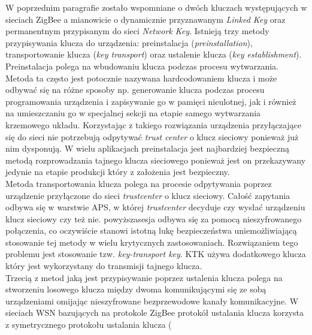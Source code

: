 \par W poprzednim paragrafie zostało wspomniane o dwóch kluczach występujących w sieciach ZigBee a mianowicie o dynamicznie przyznawanym \textit{Linked Key} oraz permanentnym przypisanym do sieci \textit{Network Key}. Istnieją trzy metody przypisywania klucza do urządzenia: preinstalacja (\textit{preinstallation}), transportowanie klucza (\textit{key transport}) oraz ustalenie klucza (\textit{key establishment}). \\
Preinstalacja polega na wbudowaniu klucza podczas procesu wytwarzania. Metoda ta często jest potocznie nazywana hardcodowaniem klucza i może odbywać się na różne sposoby np. generowanie klucza podczas procesu programowania urządzenia i zapisywanie go w pamięci nieulotnej, jak i również na umieszczaniu go w specjalnej sekcji na etapie samego wytwarzania krzemowego układu. Korzystając z takiego rozwiązania urządzenia przyłączające się do sieci nie potrzebują odpytywać \textit{trust center} o klucz sieciowy ponieważ już nim dysponują. W wielu aplikacjach preinstalacja jest najbardziej bezpieczną metodą rozprowadzania tajnego klucza sieciowego ponieważ jest on przekazywany jedynie na etapie produkcji który z założenia jest bezpieczny.\\
Metoda transportowania klucza polega na procesie odpytywania poprzez urządzenie przyłączone do sieci \textit{trustcenter} o klucz sieciowy. Całość zapytania odbywa się w warstwie APS, w której \textit{trustcenter} decyduje czy wysłać urządzeniu klucz sieciowy czy też nie. powyższasesja odbywa się za pomocą nieszyfrowanego połączenia, co oczywiście stanowi istotną lukę bezpieczeństwa uniemożliwiającą stosowanie tej metody w wielu krytycznych zastosowaniach. Rozwiązaniem tego problemu jest stosowanie tzw. \textit{key-transport key}. KTK używa dodatkowego klucza który jest wykorzystany do transmisji tajnego klucza. \\
Trzecią z metod jaką jest przypisywanie poprzez ustalenia klucza polega na stworzeniu losowego klucza między dwoma komunikującymi się ze sobą urządzeniami omijając nieszyfrowane bezprzewodowe kanały komunikacyjne. W sieciach WSN bazujących na protokole ZigBee protokół ustalania klucza korzysta z symetrycznego protokołu ustalania klucza (




